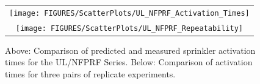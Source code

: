 \begin{figure}[p]
\label{UL_NFPRF}
\begin{center}
\begin{tabular}{c}
\texttt{[image: FIGURES/ScatterPlots/UL\_NFPRF\_Activation\_Times]} \\
\texttt{[image: FIGURES/ScatterPlots/UL\_NFPRF\_Repeatability]}
\vspace{0.25in}
\end{tabular}
\caption{Above: Comparison of predicted and measured sprinkler activation times for the UL/NFPRF Series. Below: Comparison of activation
times for three pairs of replicate experiments.}
\end{center}
\end{figure}


